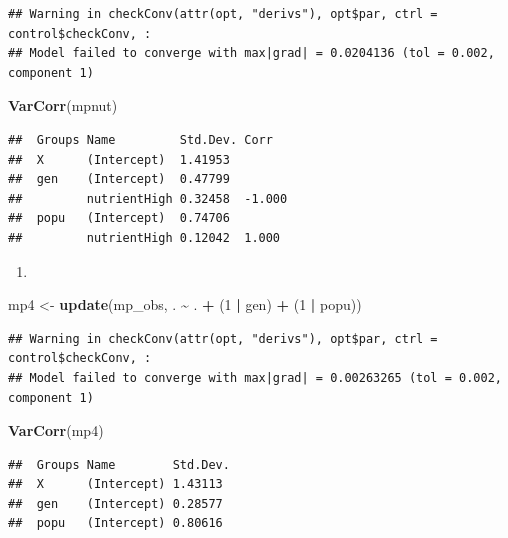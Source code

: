 \documentclass[
  12pt,
]{book}
\newenvironment{Shaded}{\begin{snugshade}}{\end{snugshade}}
\newcommand{\DecValTok}[1]{\textcolor[rgb]{0.00,0.00,0.81}{#1}}
\newcommand{\KeywordTok}[1]{\textcolor[rgb]{0.13,0.29,0.53}{\textbf{#1}}}
\newcommand{\NormalTok}[1]{#1}
\newcommand{\OperatorTok}[1]{\textcolor[rgb]{0.81,0.36,0.00}{\textbf{#1}}}
\newcommand{\StringTok}[1]{\textcolor[rgb]{0.31,0.60,0.02}{#1}}
\providecommand{\tightlist}{%
  \setlength{\itemsep}{0pt}\setlength{\parskip}{0pt}}
\begin{document}
\begin{verbatim}
## Warning in checkConv(attr(opt, "derivs"), opt$par, ctrl = control$checkConv, :
## Model failed to converge with max|grad| = 0.0204136 (tol = 0.002, component 1)
\end{verbatim}

\begin{Shaded}
\begin{Highlighting}[]
\KeywordTok{VarCorr}\NormalTok{(mpnut)}
\end{Highlighting}
\end{Shaded}

\begin{verbatim}
##  Groups Name         Std.Dev. Corr  
##  X      (Intercept)  1.41953        
##  gen    (Intercept)  0.47799        
##         nutrientHigh 0.32458  -1.000
##  popu   (Intercept)  0.74706        
##         nutrientHigh 0.12042  1.000
\end{verbatim}

\begin{enumerate}
\def\labelenumi{\arabic{enumi}.}
\setcounter{enumi}{2}
\tightlist
\item
\end{enumerate}

\begin{Shaded}
\begin{Highlighting}[]
\NormalTok{mp4 \textless{}{-}}\StringTok{ }\KeywordTok{update}\NormalTok{(mp\_obs, . }\OperatorTok{\textasciitilde{}}\StringTok{ }\NormalTok{. }\OperatorTok{+}\StringTok{ }\NormalTok{(}\DecValTok{1} \OperatorTok{|}\StringTok{ }\NormalTok{gen) }\OperatorTok{+}\StringTok{ }\NormalTok{(}\DecValTok{1} \OperatorTok{|}\StringTok{ }\NormalTok{popu))}
\end{Highlighting}
\end{Shaded}

\begin{verbatim}
## Warning in checkConv(attr(opt, "derivs"), opt$par, ctrl = control$checkConv, :
## Model failed to converge with max|grad| = 0.00263265 (tol = 0.002, component 1)
\end{verbatim}

\begin{Shaded}
\begin{Highlighting}[]
\KeywordTok{VarCorr}\NormalTok{(mp4)}
\end{Highlighting}
\end{Shaded}

\begin{verbatim}
##  Groups Name        Std.Dev.
##  X      (Intercept) 1.43113 
##  gen    (Intercept) 0.28577 
##  popu   (Intercept) 0.80616
\end{verbatim}
\end{document}
